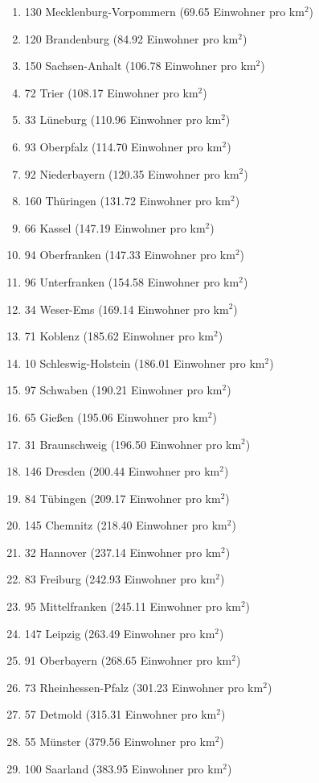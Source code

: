 \begin{enumerate}[itemsep=-6mm]
\item 130 Mecklenburg-Vorpommern (69.65 Einwohner pro km$^2$)
\item 120 Brandenburg (84.92 Einwohner pro km$^2$)
\item 150 Sachsen-Anhalt (106.78 Einwohner pro km$^2$)
\item 72 Trier (108.17 Einwohner pro km$^2$)
\item 33 Lüneburg (110.96 Einwohner pro km$^2$)
\item 93 Oberpfalz (114.70 Einwohner pro km$^2$)
\item 92 Niederbayern (120.35 Einwohner pro km$^2$)
\item 160 Thüringen (131.72 Einwohner pro km$^2$)
\item 66 Kassel (147.19 Einwohner pro km$^2$)
\item 94 Oberfranken (147.33 Einwohner pro km$^2$)
\item 96 Unterfranken (154.58 Einwohner pro km$^2$)
\item 34 Weser-Ems (169.14 Einwohner pro km$^2$)
\item 71 Koblenz (185.62 Einwohner pro km$^2$)
\item 10 Schleswig-Holstein (186.01 Einwohner pro km$^2$)
\item 97 Schwaben (190.21 Einwohner pro km$^2$)
\item 65 Gießen (195.06 Einwohner pro km$^2$)
\item 31 Braunschweig (196.50 Einwohner pro km$^2$)
\item 146 Dresden (200.44 Einwohner pro km$^2$)
\item 84 Tübingen (209.17 Einwohner pro km$^2$)
\item 145 Chemnitz (218.40 Einwohner pro km$^2$)
\item 32 Hannover (237.14 Einwohner pro km$^2$)
\item 83 Freiburg (242.93 Einwohner pro km$^2$)
\item 95 Mittelfranken (245.11 Einwohner pro km$^2$)
\item 147 Leipzig (263.49 Einwohner pro km$^2$)
\item 91 Oberbayern (268.65 Einwohner pro km$^2$)
\item 73 Rheinhessen-Pfalz (301.23 Einwohner pro km$^2$)
\item 57 Detmold (315.31 Einwohner pro km$^2$)
\item 55 Münster (379.56 Einwohner pro km$^2$)
\item 100 Saarland (383.95 Einwohner pro km$^2$)

\end{enumerate}
